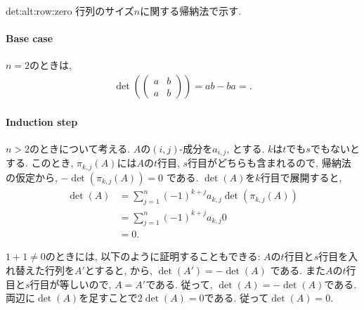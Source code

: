 \begin{proofof}{det:alt:row:zero}
  行列のサイズ$n$に関する帰納法で示す.
  \paragraph{Base case}
  $n=2$のときは,
  \begin{align*}
    \det(
    \begin{pmatrix}
      a&b\\
      a&b
    \end{pmatrix}
    )=ab-ba=.
  \end{align*}

  \paragraph{Induction step}
  $n>2$のときについて考える.
  $A$の$(i,j)$-成分を$a_{i,j}$,
  とする.
  $k$は$t$でも$s$でもないとする.
  このとき,
  $\pi_{k,j}(A)$には$A$の$t$行目, $s$行目がどちらも含まれるので,
  帰納法の仮定から,
  $-\det(\pi_{k,j}(A))=0$
  である.
  $\det(A)$を$k$行目で展開すると,
  \begin{align*}
    \det(A)
    &=\sum_{j=1}^{n} (-1)^{k+j} a_{k,j}\det(\pi_{k,j}(A))\\
    &=\sum_{j=1}^{n} (-1)^{k+j} a_{k,j}0\\
    &=0.
  \end{align*}
\end{proofof}
\begin{remark}
  $1+1\neq 0$のときには,
  以下のように証明することもできる:
  $A$の$t$行目と$s$行目を入れ替えた行列を$A'$とすると,
  から, $\det(A')=-\det(A)$
  である.
  また$A$の$t$行目と$s$行目が等しいので, $A=A'$である.
  従って, $\det(A)=-\det(A)$である.
  両辺に$\det(A)$を足すことで$2\det(A)=0$である.
  従って$\det(A)=0$.  
\end{remark}



